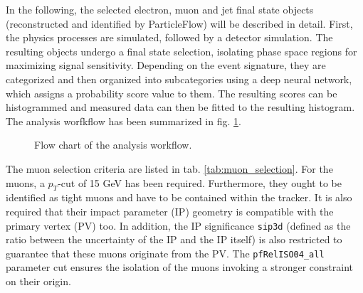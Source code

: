 
In the following, the selected electron, muon and jet final state objects (reconstructed and identified by ParticleFlow) will be described in detail. First, the physics processes are simulated, followed by a detector simulation. The resulting objects undergo a final state selection, isolating phase space regions for maximizing signal sensitivity. Depending on the event signature, they are categorized and then organized into subcategories using a deep neural network, which assigns a probability score value to them. The resulting scores can be histogrammed and measured data can then be fitted to the resulting histogram. The analysis worfkflow has been summarized in fig. \ref{fig:analysis_workflow}.

\begin{figure}[h!]
	\centering
	\caption{Flow chart of the analysis workflow.}
	\label{fig:analysis_workflow}
\end{figure}


The muon selection criteria are listed in tab. \ref{tab:muon_selection}. For the muons, a $p_T$-cut of 15 GeV has been required. Furthermore, they ought to be identified as tight muons and have to be contained within the tracker. It is also required that their impact parameter (IP) geometry is compatible with the primary vertex (PV) too. In addition, the IP significance \texttt{sip3d} (defined as the ratio between the uncertainty of the IP and the IP itself) is also restricted to guarantee that these muons originate from the PV. The \texttt{pfRelISO04\_all} parameter cut ensures the isolation of the muons invoking a stronger constraint on their origin.

